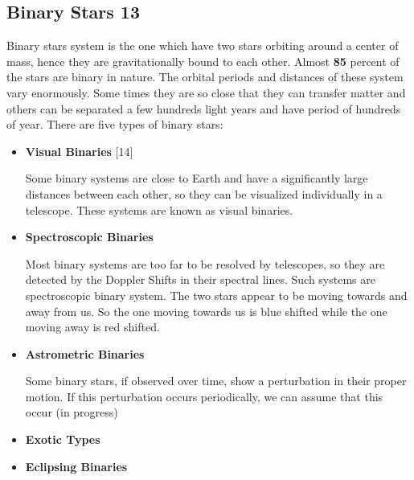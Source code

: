 \documentclass{article}
\begin{document}
\subsection*{Binary Stars 13}
Binary stars system is the one which have two stars orbiting around a center of mass, hence they are gravitationally bound to each other. Almost \textbf{85} percent of the stars are binary in nature. The orbital periods and distances of these system vary enormously. Some times they are so close that they can transfer matter and others can be separated a few hundreds light years and have period of hundreds of year. There are five types of binary stars: 
\begin{itemize}
\item \textbf{Visual Binaries} [14]

  Some binary systems are close to Earth and have a significantly large distances between each    other, so they can be visualized individually in a telescope. These systems are known as visual binaries. 
\item \textbf{Spectroscopic Binaries }

Most binary systems are too far to be resolved by telescopes, so they are detected by the Doppler Shifts in their spectral lines. Such systems are spectroscopic binary system. The two stars appear to be moving towards and away from us. So the one moving towards us is blue shifted while the one moving away is red shifted.


\item\textbf{ Astrometric Binaries}

Some binary stars, if observed over time, show a perturbation in their proper motion. If this perturbation occurs periodically, we can assume that this occur (in progress)

\item \textbf{Exotic Types}

\item \textbf{Eclipsing Binaries}
\end{itemize}
  
\end{document}
